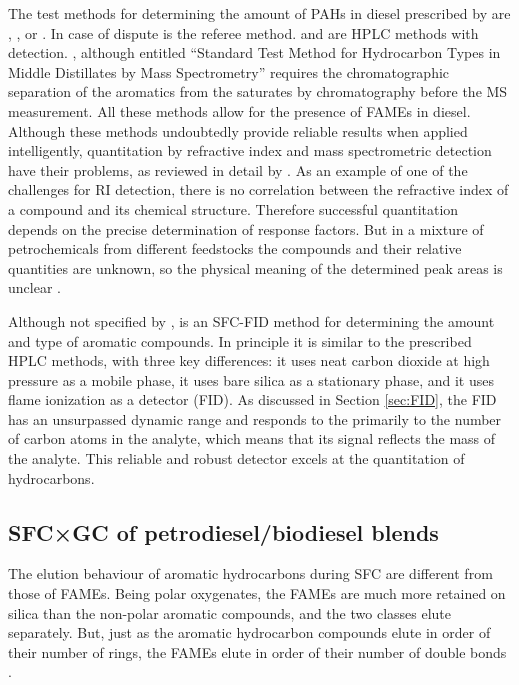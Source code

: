 The test methods for determining the amount of PAHs in diesel prescribed by
 are , , or . In case of
dispute  is the referee method.  and  
are HPLC methods with  detection. ,
although entitled ``Standard Test Method for Hydrocarbon Types in Middle
Distillates by Mass Spectrometry'' requires the chromatographic separation of
the aromatics from the saturates by chromatography before the MS measurement.
All these methods allow for the presence of FAMEs in diesel.
Although these methods undoubtedly provide reliable results when applied
intelligently, quantitation by refractive index and mass spectrometric detection
have their problems, as reviewed in detail by \cite{Kaminski2005}.
As an example of one of the challenges for RI detection, there is no correlation
between the refractive index of a compound and its chemical structure. Therefore
successful quantitation depends on the precise determination of response
factors. But in a mixture of petrochemicals from different feedstocks the
compounds and their relative quantities are unknown, so the physical meaning of
the determined peak areas is unclear \autocite{Sarowha2000}.

Although not specified by ,  is an SFC-FID method
for determining the amount and type of aromatic compounds. In principle it is
similar to the prescribed HPLC methods, with three key differences: it uses neat
carbon dioxide at high pressure as a mobile phase, it uses bare silica as a
stationary phase, and it uses flame ionization as a detector (FID). As discussed
in Section \ref{sec:FID}, the FID has an unsurpassed dynamic range and responds
to the primarily to the number of carbon atoms in the analyte, which means that
its signal reflects the mass of the analyte. This reliable and robust detector
excels at the quantitation of hydrocarbons.

\subsection{SFC×GC of petrodiesel/biodiesel blends}

The elution behaviour of aromatic hydrocarbons during SFC are different from
those of FAMEs. Being polar oxygenates, the FAMEs are much more retained on
silica than the non-polar aromatic compounds, and the two classes elute
separately. But, just as the aromatic hydrocarbon compounds elute in order of
their number of rings, the FAMEs elute in order of their number of double bonds
\autocite{Smith2001}.

